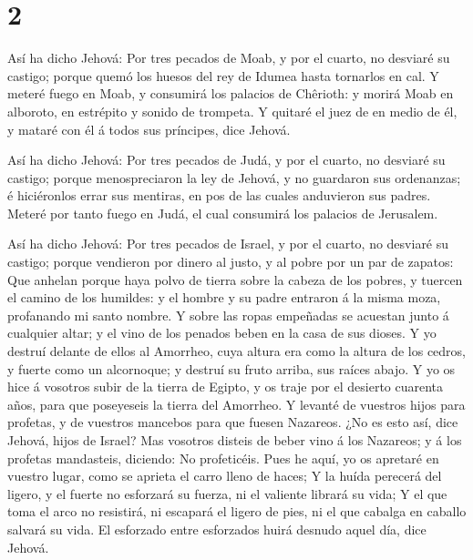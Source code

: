 \hypertarget{section-1}{%
\section{2}\label{section-1}}

 Así ha dicho Jehová: Por tres pecados de Moab, y por el
cuarto, no desviaré su castigo; porque quemó los huesos del rey de
Idumea hasta tornarlos en cal.  Y meteré fuego en Moab, y
consumirá los palacios de Chêrioth: y morirá Moab en alboroto, en
estrépito y sonido de trompeta.  Y quitaré el juez de en
medio de él, y mataré con él á todos sus príncipes, dice Jehová.

 Así ha dicho Jehová: Por tres pecados de Judá, y por el
cuarto, no desviaré su castigo; porque menospreciaron la ley de Jehová,
y no guardaron sus ordenanzas; é hiciéronlos errar sus mentiras, en pos
de las cuales anduvieron sus padres.  Meteré por tanto fuego
en Judá, el cual consumirá los palacios de Jerusalem.

 Así ha dicho Jehová: Por tres pecados de Israel, y por el
cuarto, no desviaré su castigo; porque vendieron por dinero al justo, y
al pobre por un par de zapatos:  Que anhelan porque haya
polvo de tierra sobre la cabeza de los pobres, y tuercen el camino de
los humildes: y el hombre y su padre entraron á la misma moza,
profanando mi santo nombre.  Y sobre las ropas empeñadas se
acuestan junto á cualquier altar; y el vino de los penados beben en la
casa de sus dioses.  Y yo destruí delante de ellos al
Amorrheo, cuya altura era como la altura de los cedros, y fuerte como un
alcornoque; y destruí su fruto arriba, sus raíces abajo.  Y
yo os hice á vosotros subir de la tierra de Egipto, y os traje por el
desierto cuarenta años, para que poseyeseis la tierra del Amorrheo.
 Y levanté de vuestros hijos para profetas, y de vuestros
mancebos para que fuesen Nazareos. ¿No es esto así, dice Jehová, hijos
de Israel?  Mas vosotros disteis de beber vino á los
Nazareos; y á los profetas mandasteis, diciendo: No profeticéis.
 Pues he aquí, yo os apretaré en vuestro lugar, como se
aprieta el carro lleno de haces;  Y la huída perecerá del
ligero, y el fuerte no esforzará su fuerza, ni el valiente librará su
vida;  Y el que toma el arco no resistirá, ni escapará el
ligero de pies, ni el que cabalga en caballo salvará su vida.
 El esforzado entre esforzados huirá desnudo aquel día,
dice Jehová.

